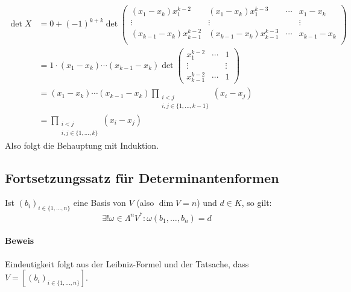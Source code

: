 \begin{Definition}
 		\begin{align*}
 			\det X &= 0+(-1)^{k+k}\det
 			\begin{pmatrix}
 			(x_1-x_k)x_1^{k-2}         & (x_1-x_k)x_1^{k-3}         & \cdots & x_1-x_k     \\
 			\vdots                     & \vdots                     &        & \vdots      \\
 			(x_{k-1}-x_k)x_{k-1}^{k-2} & (x_{k-1}-x_k)x_{k-1}^{k-3} & \cdots & x_{k-1}-x_k \\
 			\end{pmatrix}
 			\\
 			&= 1\cdot(x_1-x_k)\cdots (x_{k-1}-x_k)\det
 			\begin{pmatrix}
 			x_1^{k-2} & \cdots & 1 \\
 			\vdots &  & \vdots \\
 			x_{k-1}^{k-2} & \cdots & 1
 			\end{pmatrix}
 			\\
 			&=(x_1-x_k)\cdots(x_{k-1}-x_k)\prod_{\substack{i<j\\ i,j\in\{1,\dots, k-1 \}}}(x_i-x_j)\\
 			&= \prod_{\substack{i<j\\ i,j\in \{1,\dots,k\}}}(x_i-x_j)
 		\end{align*}
 		Also folgt die Behauptung mit Induktion.
 	\end{Definition}
 \subsection{Fortsetzungssatz für Determinantenformen}
 	\begin{Satz}
 		Ist $ (b_i)_{i\in \{1,\dots,n\}} $ eine Basis von $ V $ (also $ \dim V = n $) und $ d\in K $, so gilt:
 		\[
 			\exists! \omega\in\Lambda^nV^*:\omega(b_1,\dots,b_n) = d
 		\]
 	\end{Satz}
 	\paragraph{Beweis}
 		Eindeutigkeit folgt aus der Leibniz-Formel und der Tatsache, dass $ V=[(b_i)_{i\in\{1,\dots,n\}}] $.

